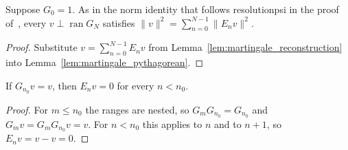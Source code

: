 \begin{lemma}
    \label{lem:martingale_norm_decomposition}
    \leanok
    Suppose $G_0=1$. As in the norm identity that follows \textup{resolutionpsi} in the
    proof of~\cite[Theorem~2.1(i)]{Nachtergaele1996Spectral}, every
    $v\perp\operatorname{ran}G_N$ satisfies
    $\lVert v\rVert^2=\sum_{n=0}^{N-1}\lVert E_nv\rVert^2$.
\end{lemma}
\begin{proof}\leanok
    Substitute $v=\sum_{n=0}^{N-1}E_nv$ from Lemma~\ref{lem:martingale_reconstruction}
    into Lemma~\ref{lem:martingale_pythagorean}.
\end{proof}

\begin{lemma}
    \label{lem:martingale_below_level}
    \leanok
    If $G_{n_0}v=v$, then $E_nv=0$ for every $n<n_0$.
\end{lemma}
\begin{proof}\leanok
    For $m\le n_0$ the ranges are nested, so $G_mG_{n_0}=G_{n_0}$ and
    $G_mv=G_mG_{n_0}v=v$. For $n<n_0$ this applies to $n$ and to $n+1$, so
    $E_nv=v-v=0$.
\end{proof}

